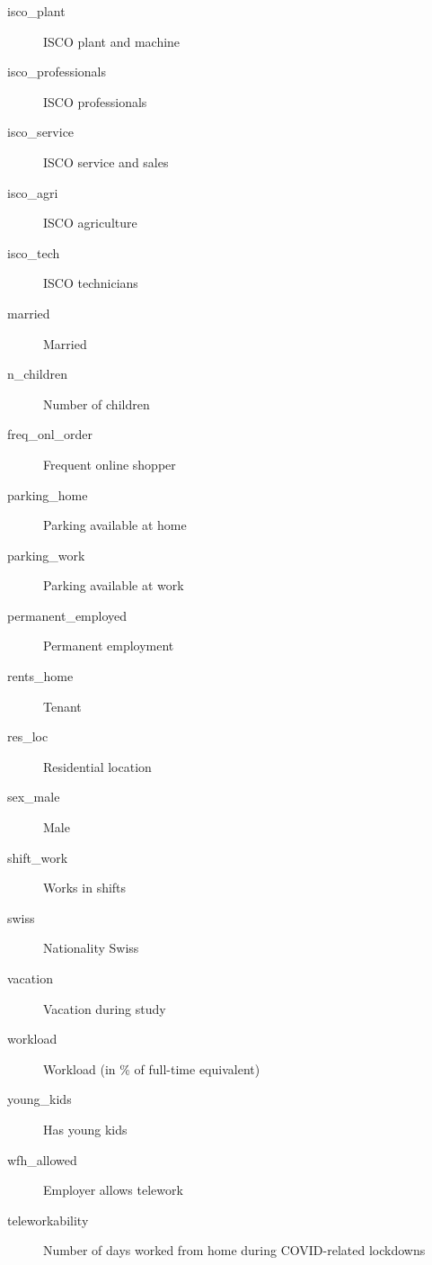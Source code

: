 \begin{Format}
\begin{description}
\item[isco\_plant] ISCO plant and machine
\item[isco\_professionals] ISCO professionals
\item[isco\_service] ISCO service and sales
\item[isco\_agri] ISCO agriculture
\item[isco\_tech] ISCO technicians
\item[married] Married
\item[n\_children] Number of children
\item[freq\_onl\_order] Frequent online shopper
\item[parking\_home] Parking available at home
\item[parking\_work] Parking available at work
\item[permanent\_employed] Permanent employment
\item[rents\_home] Tenant
\item[res\_loc] Residential location
\item[sex\_male] Male
\item[shift\_work] Works in shifts
\item[swiss] Nationality Swiss
\item[vacation] Vacation during study
\item[workload] Workload (in \% of full-time equivalent)
\item[young\_kids] Has young kids
\item[wfh\_allowed] Employer allows telework
\item[teleworkability] Number of days worked from home during COVID-related lockdowns

\end{description}

\end{Format}
%
\begin{References}
\end{References}

